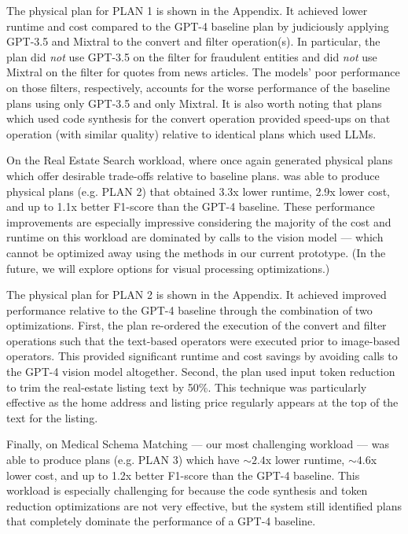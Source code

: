 The physical plan for PLAN 1 is shown in the Appendix. It achieved lower runtime and cost compared to the GPT-4 baseline plan by judiciously applying GPT-3.5 and Mixtral to the convert and filter operation(s). In particular, the plan did {\it not} use GPT-3.5 on the filter for fraudulent entities and did {\it not} use Mixtral on the filter for quotes from news articles. The models' poor performance on those filters, respectively, accounts for the worse performance of the baseline plans using only GPT-3.5 and only Mixtral. It is also worth noting that plans which used code synthesis for the convert operation provided speed-ups on that operation (with similar quality) relative to identical plans which used LLMs.  

On the Real Estate Search workload, where \system{} once again generated physical plans which offer desirable trade-offs relative to baseline plans. \system{} was able to produce physical plans (e.g. PLAN 2) that obtained 3.3x lower runtime, 2.9x lower cost, and up to 1.1x better F1-score than the GPT-4 baseline. These performance improvements are especially impressive considering the majority of the cost and runtime on this workload are dominated by calls to the vision model --- which cannot be optimized away using the methods in our current prototype. (In the future, we will explore options for visual processing optimizations.)

The physical plan for PLAN 2 is shown in the Appendix. It achieved improved performance relative to the GPT-4 baseline through the combination of two optimizations. First, the plan re-ordered the execution of the convert and filter operations such that the text-based operators were executed prior to image-based operators. This provided significant runtime and cost savings by avoiding calls to the GPT-4 vision model altogether. Second, the plan used input token reduction to trim the real-estate listing text by 50\%. This technique was particularly effective as the home address and listing price regularly appears at the top of the text for the listing.

Finally, on Medical Schema Matching --- our most challenging workload --- \system{} was able to produce plans (e.g. PLAN 3) which have $\sim2.4$x lower runtime, $\sim4.6$x lower cost, and up to 1.2x better F1-score than the GPT-4 baseline. This workload is especially challenging for \system{} because the code synthesis and token reduction optimizations are not very effective, but the system still identified plans that completely dominate the performance of a GPT-4 baseline.

